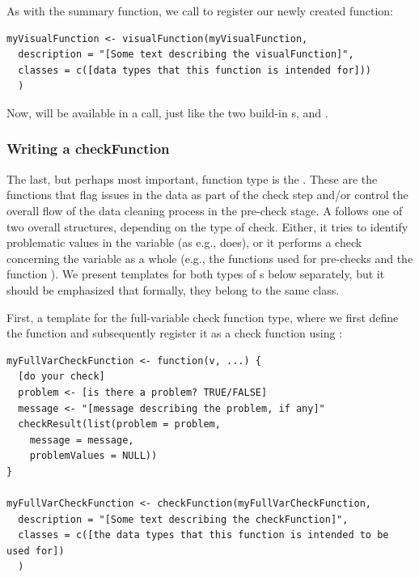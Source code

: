 \documentclass[article,shortnames]{jss}
\begin{document}
As with the summary function, we call  to
register our newly created function:
\begin{Verbatim}
myVisualFunction <- visualFunction(myVisualFunction,
  description = "[Some text describing the visualFunction]",
  classes = c([data types that this function is intended for]))
  )
\end{Verbatim}

Now,  will be available in a 
call, just like the two build-in s, 
and .

\subsubsection{Writing a checkFunction}
The last, but perhaps most important,  function type is
the . These are the functions that flag issues in
the data as part of the check step and/or control the overall flow of the data
cleaning process in the pre-check stage. A  follows
one of two overall structures, depending on the type of check. Either,
it tries to identify problematic values in the variable (as
e.g.,  does), or it performs a check concerning the
variable as a whole (e.g., the functions used for pre-checks and the
function ). We present templates for both types of
s below separately, but it should be emphasized that
formally, they belong to the same class.

First, a template for the full-variable check function type, where we
first define the function and subsequently register it as a check
function using :
\begin{Verbatim}
myFullVarCheckFunction <- function(v, ...) {
  [do your check]
  problem <- [is there a problem? TRUE/FALSE]
  message <- "[message describing the problem, if any]"
  checkResult(list(problem = problem,
    message = message,
    problemValues = NULL))
}

myFullVarCheckFunction <- checkFunction(myFullVarCheckFunction,
  description = "[Some text describing the checkFunction]",
  classes = c([the data types that this function is intended to be used for])
  )
\end{Verbatim}
\end{document}
